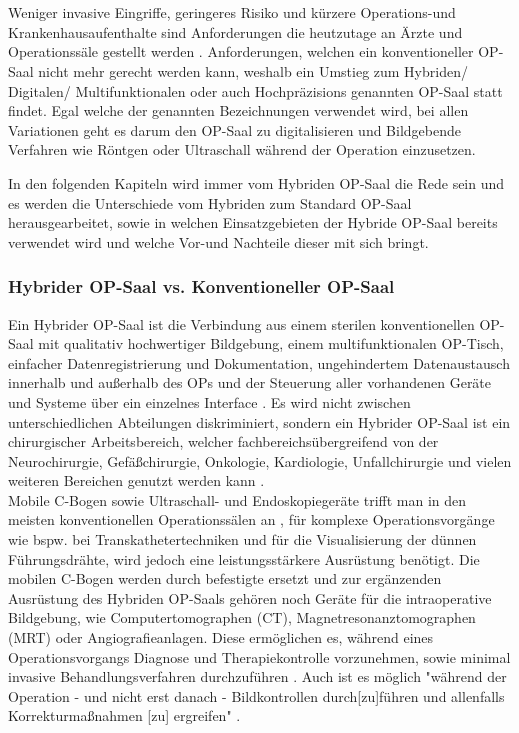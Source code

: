 \chapter{}
\label{sec:overview}

Weniger invasive Eingriffe, geringeres Risiko und kürzere Operations-und Krankenhausaufenthalte sind Anforderungen die heutzutage an Ärzte und Operationssäle gestellt werden \cite{DerDigitaleOperationssaal}. Anforderungen, welchen ein konventioneller OP-Saal nicht mehr gerecht werden kann, weshalb ein Umstieg zum Hybriden/ Digitalen/ Multifunktionalen oder auch Hochpräzisions genannten OP-Saal statt findet. Egal welche der genannten Bezeichnungen verwendet wird, bei allen Variationen geht es darum den OP-Saal zu digitalisieren und Bildgebende Verfahren wie Röntgen oder Ultraschall während der Operation einzusetzen.

In den folgenden Kapiteln wird immer vom Hybriden OP-Saal die Rede sein und es werden die Unterschiede vom Hybriden zum Standard OP-Saal herausgearbeitet, sowie in welchen Einsatzgebieten der Hybride OP-Saal bereits verwendet wird und welche Vor-und Nachteile dieser mit sich bringt.

\subsection{Hybrider OP-Saal vs. Konventioneller OP-Saal} 

Ein Hybrider OP-Saal ist die Verbindung aus einem sterilen konventionellen OP-Saal mit qualitativ hochwertiger Bildgebung, einem multifunktionalen OP-Tisch, einfacher Datenregistrierung und Dokumentation, ungehindertem Datenaustausch innerhalb und außerhalb des OPs und der Steuerung aller vorhandenen Geräte und Systeme über ein einzelnes Interface \cite{HybriderVsKonventioneller,KarlStorz}. Es wird nicht zwischen unterschiedlichen Abteilungen diskriminiert, sondern ein Hybrider OP-Saal ist ein chirurgischer Arbeitsbereich, welcher fachbereichsübergreifend von der Neurochirurgie, Gefäßchirurgie, Onkologie, Kardiologie, Unfallchirurgie und vielen weiteren Bereichen genutzt werden kann \cite{Getinge}.\\
Mobile C-Bogen sowie Ultraschall- und Endoskopiegeräte trifft man in den meisten konventionellen Operationssälen an \cite{TechnicalConsiderations}, für komplexe Operationsvorgänge wie bspw. bei Transkathetertechniken und für die Visualisierung der dünnen Führungsdrähte, wird jedoch eine leistungsstärkere Ausrüstung benötigt. Die mobilen C-Bogen werden durch befestigte ersetzt und zur ergänzenden Ausrüstung des Hybriden OP-Saals gehören noch Geräte für die intraoperative Bildgebung, wie Computertomographen (CT), Magnetresonanztomographen (MRT) oder Angiografieanlagen. Diese ermöglichen es, während eines Operationsvorgangs Diagnose und Therapiekontrolle vorzunehmen, sowie minimal invasive Behandlungsverfahren durchzuführen \cite{SHG-Kliniken}. Auch ist es möglich "während der Operation - und nicht erst danach - Bildkontrollen durch[zu]führen und allenfalls Korrekturmaßnahmen [zu] ergreifen" \cite{OPderZukunft}.

